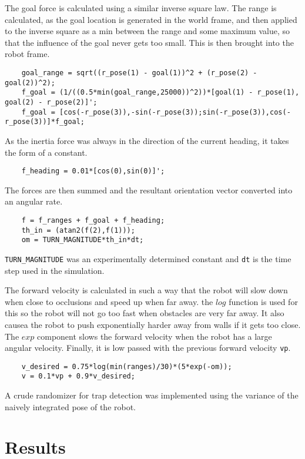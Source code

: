 The goal force is calculated using a similar inverse square law. The range is calculated, as the goal location is generated in the world frame, and then applied to the inverse square as a min between the range and some maximum value, so that the influence of the goal never gets too small. This is then brought into the robot frame.

\begin{lstlisting}
	goal_range = sqrt((r_pose(1) - goal(1))^2 + (r_pose(2) - goal(2))^2);
	f_goal = (1/((0.5*min(goal_range,25000))^2))*[goal(1) - r_pose(1), goal(2) - r_pose(2)]';
	f_goal = [cos(-r_pose(3)),-sin(-r_pose(3));sin(-r_pose(3)),cos(-r_pose(3))]*f_goal;
\end{lstlisting}
As the inertia force was always in the direction of the current heading, it takes the form of a constant.

\begin{lstlisting}
	f_heading = 0.01*[cos(0),sin(0)]';
\end{lstlisting}
The forces are then summed and the resultant orientation vector converted into an angular rate. 

\begin{lstlisting}
	f = f_ranges + f_goal + f_heading;
	th_in = (atan2(f(2),f(1)));
	om = TURN_MAGNITUDE*th_in*dt;
\end{lstlisting}
\lstinline$TURN_MAGNITUDE$ was an experimentally determined constant and \lstinline$dt$ is the time step used in the simulation.

The forward velocity is calculated in such a way that the robot will slow down when close to occlusions and speed up when far away. the $log$ function is used for this so the robot will not go too fast when obstacles are very far away. It also causea the robot to push exponentially harder away from walls if it gets too close. The $exp$ component slows the forward velocity when the robot has a large angular velocity. Finally, it is low passed with the previous forward velocity \lstinline$vp$.

\begin{lstlisting}
	v_desired = 0.75*log(min(ranges)/30)*(5*exp(-om));
	v = 0.1*vp + 0.9*v_desired;
\end{lstlisting}

A crude randomizer for trap detection was implemented using the variance of the naively integrated pose of the robot.

\section{Results}

